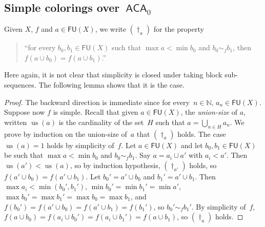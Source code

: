\documentclass{article}
\newcommand{\ACA}[0]{\mathsf{ACA}}
\newcommand{\NN}[0]{\mathbb{N}}
\newcommand{\us}{\operatorname{us}}
\newcommand{\FU}[0]{\mathsf{FU}} %
\def\qt#1{``#1''}%
\numberwithin{theorem}{section}
\newtheorem{lemma}[theorem]{Lemma}
\begin{document}
\subsection{Simple colorings over~$\ACA_0$}

Given $X$, $f$ and $a \in \FU(X)$, we write $(\dagger_a)$ for the property 
\begin{quote}
\qt{for every $b_0, b_1 \in \FU(X)$ such that $\max a < \min b_0$ and $b_0 \sim_f b_1$, then $f(a \cup b_0) = f(a \cup b_1)$.}
\end{quote}

Here again, it is not clear that simplicity is closed under taking block sub-sequences.
The following lemma shows that it is the case.

\begin{proof}
The backward direction is immediate since for every~$n \in \NN$, $a_n \in \FU(X)$.
Suppose now $f$ is simple. Recall that given $a \in \FU(X)$, the \emph{union-size} of $a$, written $\us(a)$ is the cardinality of the set~$H$ such that $a = \bigcup_{n \in H} a_n$. We prove by induction on the union-size of~$a$ that $(\dagger_{a})$ holds. The case $\us(a) = 1$ holds by simplicity of~$f$. Let $a \in \FU(X)$ and let $b_0, b_1 \in \FU(X)$ be such that $\max a < \min b_0$ and $b_0 \sim_f b_1$. Say $a = a_i \cup a'$ with $a_i < a'$.
Then $\us(a') < \us(a)$, so by induction hypothesis, $(\dagger_{a'})$ holds, so $f(a' \cup b_0) = f(a' \cup b_1)$.
Let $b_0' = a' \cup b_0$ and $b_1' = a' \cup b_1$. Then $\max a_i < \min(b_0',b_1')$, $\min b_0' = \min b_1' = \min a'$, $\max b_0' = \max b_1'=  \max b_0 = \max b_1$, and $f(b_0') = f(a' \cup b_0) = f(a' \cup b_1) = f(b_1')$, so $b_0' \sim_f b_1'$. By simplicity of~$f$, $f(a \cup b_0) = f(a_i \cup b_0') = f(a_i \cup b_1') = f(a \cup b_1)$, so $(\dagger_a)$ holds. 
\end{proof}
\end{document}
